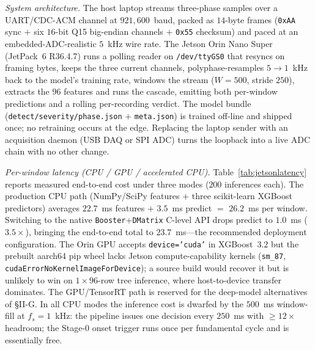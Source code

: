 \documentclass[journal]{IEEEtran}
\begin{document}
\emph{System architecture.} The host laptop streams three-phase samples over a UART/CDC-ACM
channel at $921{,}600$~baud, packed as $14$-byte frames (\texttt{0xAA} sync $+$ six
$16$-bit Q15 big-endian channels $+$ \texttt{0x55} checksum) and paced at an
embedded-ADC-realistic $5$~kHz wire rate. The Jetson Orin Nano Super (JetPack~6 R36.4.7)
runs a polling reader on \verb|/dev/ttyGS0| that resyncs on framing bytes, keeps the
three current channels, polyphase-resamples $5\!\rightarrow\!1$~kHz back to the model's
training rate, windows the stream ($W{=}500$, stride $250$), extracts the $96$
features and runs the cascade, emitting both per-window predictions and a rolling
per-recording verdict. The model bundle (\verb|detect/severity/phase.json| $+$
\verb|meta.json|) is trained off-line and shipped once; no retraining occurs at the edge.
Replacing the laptop sender with an acquisition daemon (USB DAQ or SPI ADC) turns the
loopback into a live ADC chain with no other change.

\emph{Per-window latency (CPU / GPU / accelerated CPU).} Table~\ref{tab:jetsonlatency}
reports measured end-to-end cost under three modes ($200$ inferences each).
The production CPU path (NumPy/SciPy features $+$ three scikit-learn XGBoost predictors)
averages $22.7$~ms features $+$ $3.5$~ms predict $=$ $26.2$~ms per window. Switching to
the native \texttt{Booster}+\texttt{DMatrix} C-level API drops predict to $1.0$~ms
($3.5\times$), bringing the end-to-end total to $23.7$~ms---the recommended deployment
configuration. The Orin GPU accepts \texttt{device='cuda'} in XGBoost~$3.2$ but the
prebuilt aarch64 pip wheel lacks Jetson compute-capability kernels (\texttt{sm\_87},
\texttt{cudaErrorNoKernelImageForDevice}); a source build would recover it but is unlikely
to win on $1{\times}96$-row tree inference, where host-to-device transfer dominates. The
GPU/TensorRT path is reserved for the deep-model alternatives of \S II-G. In all CPU
modes the inference cost is dwarfed by the $500$~ms window-fill at $f_s{=}1$~kHz: the
pipeline issues one decision every $250$~ms with $\geq\!\!12\times$ headroom; the
Stage-$0$ onset trigger runs once per fundamental cycle and is essentially free.
\end{document}
